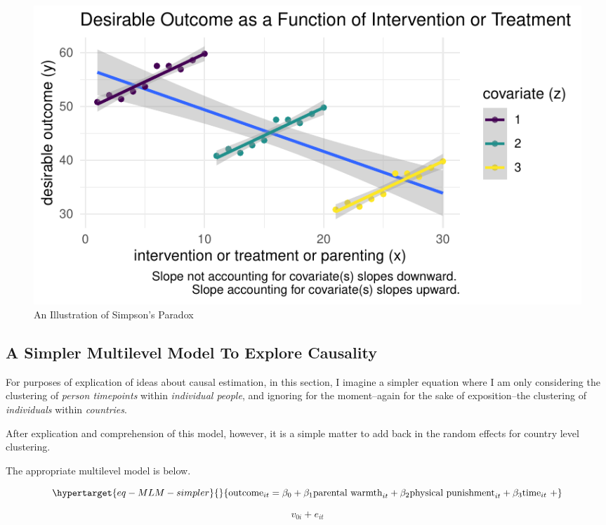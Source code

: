 \documentclass[
  letterpaper,
  DIV=11,
  numbers=noendperiod]{scrreprt}
\begin{document}
\begin{figure}

{\centering \includegraphics{./longitudinal_files/figure-pdf/fig-Simpson-1.pdf}

}

\caption{\label{fig-Simpson}An Illustration of Simpson's Paradox}

\end{figure}

\hypertarget{a-simpler-multilevel-model-to-explore-causality}{%
\subsection{A Simpler Multilevel Model To Explore
Causality}\label{a-simpler-multilevel-model-to-explore-causality}}

For purposes of explication of ideas about causal estimation, in this
section, I imagine a simpler equation where I am only considering the
clustering of \emph{person timepoints} within \emph{individual people},
and ignoring for the moment--again for the sake of exposition--the
clustering of \emph{individuals} within \emph{countries}.

After explication and comprehension of this model, however, it is a
simple matter to add back in the random effects for country level
clustering.

The appropriate multilevel model is below.

\begin{equation}\protect\hypertarget{eq-MLM-simpler}{}{\text{outcome}_{it} = \beta_0 + \beta_1 \text{parental warmth}_{it} + \beta_2 \text{physical punishment}_{it} + \beta_3 \text{time}_{it} \ + }\label{eq-MLM-simpler}\end{equation}

\[v_{0i} + e_{it}\]
\end{document}
